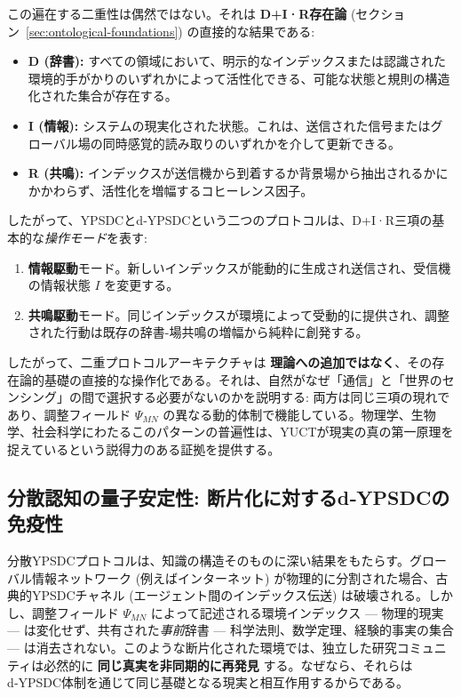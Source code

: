\documentclass[11pt,a4paper]{article}
\begin{document}
	\medskip
	\noindent
	この遍在する二重性は偶然ではない。それは \textbf{D+I·R存在論} (セクション~\ref{sec:ontological-foundations}) の直接的な結果である:
	\begin{itemize}[leftmargin=*]
		\item \textbf{D (辞書):} すべての領域において、明示的なインデックスまたは認識された環境的手がかりのいずれかによって活性化できる、可能な状態と規則の構造化された集合が存在する。
		\item \textbf{I (情報):} システムの現実化された状態。これは、送信された信号またはグローバル場の同時感覚的読み取りのいずれかを介して更新できる。
		\item \textbf{R (共鳴):} インデックスが送信機から到着するか背景場から抽出されるかにかかわらず、活性化を増幅するコヒーレンス因子。
	\end{itemize}
	
	したがって、YPSDCとd‑YPSDCという二つのプロトコルは、D+I·R三項の基本的な\emph{操作モード}を表す:
	\begin{enumerate}[leftmargin=*]
		\item \textbf{情報駆動}モード。新しいインデックスが能動的に生成され送信され、受信機の情報状態 $I$ を変更する。
		\item \textbf{共鳴駆動}モード。同じインデックスが環境によって受動的に提供され、調整された行動は既存の辞書-場共鳴の増幅から純粋に創発する。
	\end{enumerate}
	
	したがって、二重プロトコルアーキテクチャは \textbf{理論への追加ではなく}、その存在論的基礎の直接的な操作化である。それは、自然がなぜ「通信」と「世界のセンシング」の間で選択する必要がないのかを説明する: 両方は同じ三項の現れであり、調整フィールド $\Psi_{MN}$ の異なる動的体制で機能している。物理学、生物学、社会科学にわたるこのパターンの普遍性は、YUCTが現実の真の第一原理を捉えているという説得力のある証拠を提供する。
	
	\subsection{分散認知の量子安定性: 断片化に対するd‑YPSDCの免疫性}
	\label{subsec:quantum-stability-cognition}
	
	分散YPSDCプロトコルは、知識の構造そのものに深い結果をもたらす。グローバル情報ネットワーク (例えばインターネット) が物理的に分割された場合、古典的YPSDCチャネル (エージェント間のインデックス伝送) は破壊される。しかし、調整フィールド $\Psi_{MN}$ によって記述される環境インデックス — 物理的現実 — は変化せず、共有された\emph{事前}辞書 — 科学法則、数学定理、経験的事実の集合 — は消去されない。このような断片化された環境では、独立した研究コミュニティは必然的に \textbf{同じ真実を非同期的に再発見} する。なぜなら、それらはd‑YPSDC体制を通じて同じ基礎となる現実と相互作用するからである。
	
\end{document}
